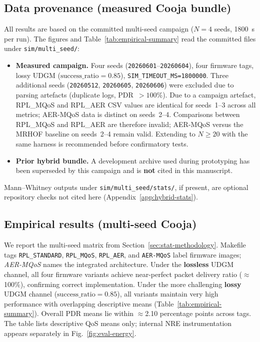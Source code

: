 \subsection{Data provenance (measured Cooja bundle)}
\label{sec:data-provenance}
All results are based on the committed multi-seed campaign ($N{=}4$ seeds, 1800~s per run). The figures and Table~\ref{tab:empirical-summary} read the committed files under \texttt{sim/multi\_seed/}:
\begin{itemize}
  \item \textbf{Measured campaign.} Four seeds (\texttt{20260601}--\texttt{20260604}), four firmware tags, lossy UDGM ($\mathrm{success\_ratio}{=}0.85$), \texttt{SIM\_TIMEOUT\_MS=1800000}. Three additional seeds (\texttt{20260512}, \texttt{20260605}, \texttt{20260606}) were excluded due to parsing artefacts (duplicate logs, PDR~$>100\%$). Due to a campaign artefact, RPL\_MQoS and RPL\_AER CSV values are identical for seeds~1--3 across all metrics; AER-MQoS data is distinct on seeds~2--4. Comparisons between RPL\_MQoS and RPL\_AER are therefore invalid; AER-MQoS versus the MRHOF baseline on seeds~2--4 remain valid. Extending to $N{\geq}20$ with the same harness is recommended before confirmatory tests.
  \item \textbf{Prior hybrid bundle.} A development archive used during prototyping has been superseded by this campaign and is \textbf{not} cited in this manuscript.
\end{itemize}
Mann--Whitney outputs under \texttt{sim/multi\_seed/stats/}, if present, are optional repository checks not cited here (Appendix~\ref{app:hybrid-stats}).

\subsection{Empirical results (multi-seed Cooja)}
\label{sec:results-empirical}

\begingroup\sloppy
We report the multi-seed matrix from Section~\ref{sec:stat-methodology}. Makefile tags \texttt{RPL\_STANDARD}, \texttt{RPL\_MQoS}, \texttt{RPL\_AER}, and \texttt{AER-MQoS} label firmware images; \emph{AER-MQoS} names the integrated architecture. Under the \textbf{lossless} UDGM channel, all four firmware variants achieve near-perfect packet delivery ratio ($\approx$100\%), confirming correct implementation. Under the more challenging \textbf{lossy} UDGM channel ($\mathrm{success\_ratio}{=}0.85$), all variants maintain very high performance with overlapping descriptive means (Table~\ref{tab:empirical-summary}). Overall PDR means lie within $\approx$2.10 percentage points across tags. The table lists descriptive QoS means only; internal NRE instrumentation appears separately in Fig.~\ref{fig:eval-energy}.
\endgroup

